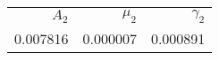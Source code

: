 \begin{tabular}{rrr}
\toprule
    $A_2$ &   $\mu_2$ &  $\gamma_2$ \\
 0.007816 &  0.000007 &    0.000891 \\
\bottomrule
\end{tabular}
